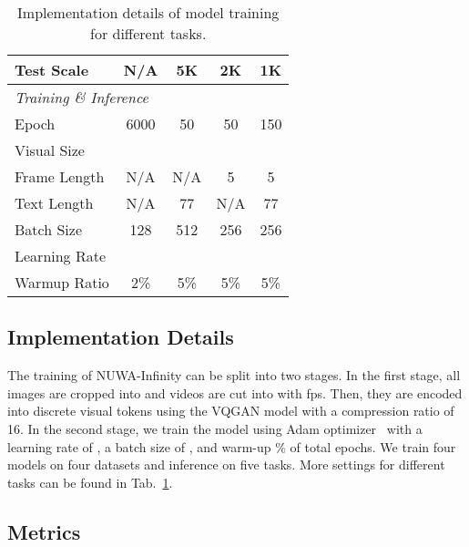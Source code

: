 \documentclass{article}
\begin{document}
\begin{table}[t]
\begin{tabular}{lcccc}
Test Scale                  & N/A                  & 5K                    & 2K                  & 1K                   \\
\midrule
\multicolumn{5}{l}{\textit{Training \& Inference}}\\
Epoch               & 6000                  & 50                   & 50                  & 150                   \\
Visual Size             &          &           &          &           \\
Frame Length  & N/A & N/A & 5 & 5 \\
Text Length              & N/A              & 77                 & N/A               & 77                 \\
Batch Size                   & 128                 & 512                  & 256                 & 256                 \\
Learning Rate                &                &                  &                &                  \\
Warmup Ratio                 & 2\%                 & 5\%                 & 5\%                 & 5\%                 \\
\bottomrule
\end{tabular}
\caption{Implementation details of model training for different tasks. }
\label{tab:implementation_details}
\end{table}




\subsection{Implementation Details}\label{sub:imp}


The training of NUWA-Infinity can be split into two stages. In the first stage, all images are cropped into  and videos are cut into  with  fps. Then, they are encoded into discrete visual tokens using the VQGAN model
with a compression ratio of 16. 
In the second stage, we train the model using Adam optimizer~\cite{kingmaAdamMethodStochastic2014} with a learning rate of , a batch size of , and warm-up \% of total  epochs. We train four models on four datasets and inference on five tasks. More settings for different tasks can be found in Tab.~\ref{tab:implementation_details}. 




\subsection{Metrics}
\end{document}
